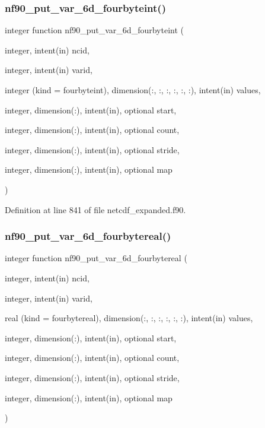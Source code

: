 \subsubsection{\texorpdfstring{nf90\+\_\+put\+\_\+var\+\_\+6d\+\_\+fourbyteint()}{nf90\_put\_var\_6d\_fourbyteint()}}
{\footnotesize\ttfamily integer function nf90\+\_\+put\+\_\+var\+\_\+6d\+\_\+fourbyteint (\begin{DoxyParamCaption}\item[{integer, intent(in)}]{ncid,  }\item[{integer, intent(in)}]{varid,  }\item[{integer (kind = fourbyteint), dimension(\+:, \+:, \+:, \+:, \+:, \+:), intent(in)}]{values,  }\item[{integer, dimension(\+:), intent(in), optional}]{start,  }\item[{integer, dimension(\+:), intent(in), optional}]{count,  }\item[{integer, dimension(\+:), intent(in), optional}]{stride,  }\item[{integer, dimension(\+:), intent(in), optional}]{map }\end{DoxyParamCaption})}



Definition at line 841 of file netcdf\+\_\+expanded.\+f90.

\mbox{\label{netcdf__expanded_8f90_ab4bd3a98db7c6b28fa9ff5378db833c9}} 
\subsubsection{\texorpdfstring{nf90\+\_\+put\+\_\+var\+\_\+6d\+\_\+fourbytereal()}{nf90\_put\_var\_6d\_fourbytereal()}}
{\footnotesize\ttfamily integer function nf90\+\_\+put\+\_\+var\+\_\+6d\+\_\+fourbytereal (\begin{DoxyParamCaption}\item[{integer, intent(in)}]{ncid,  }\item[{integer, intent(in)}]{varid,  }\item[{real (kind = fourbytereal), dimension(\+:, \+:, \+:, \+:, \+:, \+:), intent(in)}]{values,  }\item[{integer, dimension(\+:), intent(in), optional}]{start,  }\item[{integer, dimension(\+:), intent(in), optional}]{count,  }\item[{integer, dimension(\+:), intent(in), optional}]{stride,  }\item[{integer, dimension(\+:), intent(in), optional}]{map }\end{DoxyParamCaption})}



